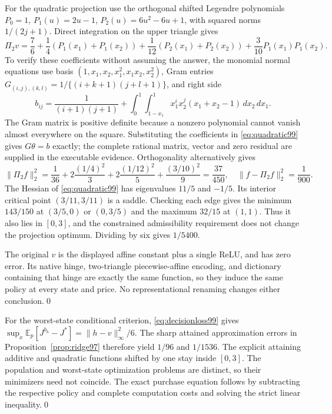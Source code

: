 For the quadratic projection use the orthogonal shifted Legendre polynomials
$P_0=1$, $P_1(u)=2u-1$, $P_2(u)=6u^2-6u+1$, with squared norms $1/(2j+1)$. Direct integration on the upper triangle gives
\[
 \Pi_2v=\frac76+\frac14(P_1(x_1)+P_1(x_2))
 +\frac1{12}(P_2(x_1)+P_2(x_2))
 +\frac3{10}P_1(x_1)P_1(x_2).
\]
To verify these coefficients without assuming the answer, the monomial normal equations use basis $(1,x_1,x_2,x_1^2,x_1x_2,x_2^2)$, Gram entries
$G_{(i,j),(k,l)}=1/\{(i+k+1)(j+l+1)\}$, and right side
\[
 b_{ij}=\frac1{(i+1)(j+1)}+
 \int_0^1\int_{1-x_1}^1x_1^ix_2^j(x_1+x_2-1)\,dx_2\,dx_1.
\]
The Gram matrix is positive definite because a nonzero polynomial cannot vanish almost everywhere on the square. Substituting the coefficients in \eqref{eq:quadratic99} gives $G\theta=b$ exactly; the complete rational matrix, vector and zero residual are supplied in the executable evidence. Orthogonality alternatively gives
\[
 \|\Pi_2 f\|_2^2
 =\frac1{36}+2\frac{(1/4)^2}{3}
       +2\frac{(1/12)^2}{5}+\frac{(3/10)^2}{9}
 =\frac{37}{450},
 \quad \|f-\Pi_2 f\|_2^2=\frac1{900}.
\]
The Hessian of \eqref{eq:quadratic99} has eigenvalues $11/5$ and $-1/5$. Its interior critical point $(3/11,3/11)$ is a saddle. Checking each edge gives the minimum $143/150$ at $(3/5,0)$ or $(0,3/5)$ and the maximum $32/15$ at $(1,1)$. Thus it also lies in $[0,3]$, and the constrained admissibility requirement does not change the projection optimum. Dividing by six gives $1/5400$.

The original $v$ is the displayed affine constant plus a single ReLU, and has zero error. Its native hinge, two-triangle piecewise-affine encoding, and dictionary containing that hinge are exactly the same function, so they induce the same policy at every state and price. No representational renaming changes either conclusion.\qed

For the worst-state conditional criterion, \eqref{eq:decisionloss99} gives
$\sup_x\mathbb E_p[J^{b_h}-J^*]=\|h-v\|_\infty^2/6$. The sharp attained approximation errors in Proposition~\ref{prop:ridge97} therefore yield $1/96$ and $1/1536$. The explicit attaining additive and quadratic functions shifted by one stay inside $[0,3]$. The population and worst-state optimization problems are distinct, so their minimizers need not coincide. The exact purchase equation follows by subtracting the respective policy and complete computation costs and solving the strict linear inequality.\qed
